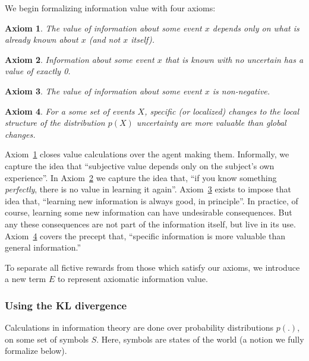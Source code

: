 \documentclass[9pt,twocolumn,twoside]{pnas-new}
\newtheorem{axiom}{Axiom}
\begin{document}
We begin formalizing information value with four axioms:

\begin{axiom}
    The value of information about some event $x$ depends \textit{only} on what is already known about $x$ (and not $x$ itself).    
    \label{ax:1}
\end{axiom}
\begin{axiom}
    Information about some event $x$ that is known with no uncertain has a value of exactly 0.
    \label{ax:2}
\end{axiom}
\begin{axiom}
    The value of information about some event $x$ is non-negative. 
    \label{ax:3}
\end{axiom}
\begin{axiom}
    For a some set of events $X$, specific (or localized) changes to the local structure of the distribution $p(X)$ uncertainty are more valuable than global changes.
    \label{ax:4}
\end{axiom}

Axiom~\ref{ax:1} closes value calculations over the agent making them. Informally, we capture the idea that ``subjective value depends only on the subject's own experience''.  In Axiom~\ref{ax:2} we capture the idea that, ``if you know something \textit{perfectly}, there is no value in learning it again''. Axiom~\ref{ax:3} exists to impose that idea that, ``learning new information is always good, in principle''. In practice, of course, learning some new information can have undesirable consequences. But any these consequences are not part of the information itself, but live in its use. Axiom~\ref{ax:4} covers the precept that, ``specific information is more valuable than general information.'' 

To separate all fictive rewards from those which satisfy our axioms, we introduce a new term $E$ to represent axiomatic information value.

\subsubsection*{Using the KL divergence}

Calculations in information theory are done over probability distributions $p(.)$, on some set of symbols $S$. Here, symbols are states of the world (a notion we fully formalize below). 
\end{document}
